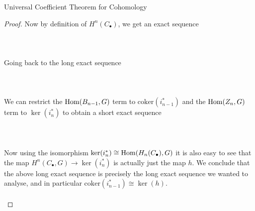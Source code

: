\documentclass[a4paper]{article}
\begin{document}
\begin{thm}{Universal Coefficient Theorem for Cohomology}{}
\begin{proof}
Now by definition of $H^n(C_\bullet)$, we get an exact sequence \\~\\
\\~\\

Going back to the long exact sequence \\~\\
\\~\\
We can restrict the $\operatorname{Hom}(B_{n-1},G)$ term to $\text{coker}(i_{n-1}^\ast)$ and the $\operatorname{Hom}(Z_n,G)$ term to $\ker(i_n^\ast)$ to obtain a short exact sequence \\~\\
\\~\\
Now using the isomorphism $\ker(i_n^\ast)\cong\operatorname{Hom}(H_n(C_\bullet),G)$ it is also easy to see that the map $H^n(C_\bullet,G)\to\ker(i_n^\ast)$ is actually just the map $h$. We conclude that the above long exact sequence is precisely the long exact sequence we wanted to analyse, and in particular $\text{coker}(i_{n-1}^\ast)\cong\ker(h)$. \\~\\


\end{proof}
\end{thm}
\end{document}

